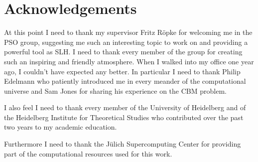 \chapter*{Acknowledgements}
\thispagestyle{empty}
At this point I need to thank my supervisor Fritz Röpke for welcoming me in the PSO group, suggesting me such an interesting topic to work on and providing a powerful tool as SLH. I need to thank every member of the group for creating such an inspiring and friendly atmosphere. When I walked into my office one year ago, I couldn't have expected any better. In particular I need to thank Philip Edelmann who patiently introduced me in every meander of the computational universe and Sam Jones for sharing his experience on the CBM problem.

I also feel I need to thank every member of the University of Heidelberg and of the Heidelberg Institute for Theoretical Studies who contributed over the past two years to my academic education.

Furthermore I need to thank the Jülich Supercomputing Center for providing part of the computational resources used for this work.

